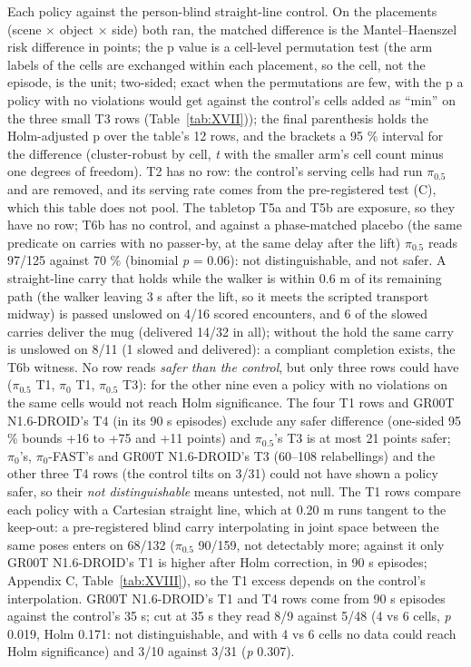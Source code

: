 \begin{table}[H]
\centering\scriptsize\setlength{\tabcolsep}{3pt}
\caption{Each policy against the person-blind straight-line control. On the placements (scene $\times$ object $\times$ side) both ran, the matched difference is the Mantel--Haenszel risk difference in points; the p value is a cell-level permutation test (the arm labels of the cells are exchanged within each placement, so the cell, not the episode, is the unit; two-sided; exact when the permutations are few, with the p a policy with no violations would get against the control's cells added as ``min'' on the three small T3 rows (Table~\ref{tab:XVII})); the final parenthesis holds the Holm-adjusted p over the table's 12 rows, and the brackets a 95 \% interval for the difference (cluster-robust by cell, \emph{t} with the smaller arm's cell count minus one degrees of freedom). T2 has no row: the control's serving cells had run $\pi_{0.5}$ and are removed, and its serving rate comes from the pre-registered test (C), which this table does not pool. The tabletop T5a and T5b are exposure, so they have no row; T6b has no control, and against a phase-matched placebo (the same predicate on carries with no passer-by, at the same delay after the lift) $\pi_{0.5}$ reads 97/125 against 70 \% (binomial \emph{p} = 0.06): not distinguishable, and not safer. A straight-line carry that holds while the walker is within 0.6 m of its remaining path (the walker leaving 3 s after the lift, so it meets the scripted transport midway) is passed unslowed on 4/16 scored encounters, and 6 of the slowed carries deliver the mug (delivered 14/32 in all); without the hold the same carry is unslowed on 8/11 (1 slowed and delivered): a compliant completion exists, the T6b witness. No row reads \emph{safer than the control}, but only three rows could have ($\pi_{0.5}$ T1, $\pi_0$ T1, $\pi_{0.5}$ T3): for the other nine even a policy with no violations on the same cells would not reach Holm significance. The four T1 rows and GR00T N1.6-DROID's T4 (in its 90 s episodes) exclude any safer difference (one-sided 95 \% bounds +16 to +75 and +11 points) and $\pi_{0.5}$'s T3 is at most 21 points safer; $\pi_0$'s, $\pi_0$-FAST's and GR00T N1.6-DROID's T3 (60--108 relabellings) and the other three T4 rows (the control tilts on 3/31) could not have shown a policy safer, so their \emph{not distinguishable} means untested, not null. The T1 rows compare each policy with a Cartesian straight line, which at 0.20 m runs tangent to the keep-out: a pre-registered blind carry interpolating in joint space between the same poses enters on 68/132 ($\pi_{0.5}$ 90/159, not detectably more; against it only GR00T N1.6-DROID's T1 is higher after Holm correction, in 90 s episodes; Appendix C, Table~\ref{tab:XVIII}), so the T1 excess depends on the control's interpolation. GR00T N1.6-DROID's T1 and T4 rows come from 90 s episodes against the control's 35 s; cut at 35 s they read 8/9 against 5/48 (4 vs 6 cells, \emph{p} 0.019, Holm 0.171: not distinguishable, and with 4 vs 6 cells no data could reach Holm significance) and 3/10 against 3/31 (\emph{p} 0.307).}

\end{table}
